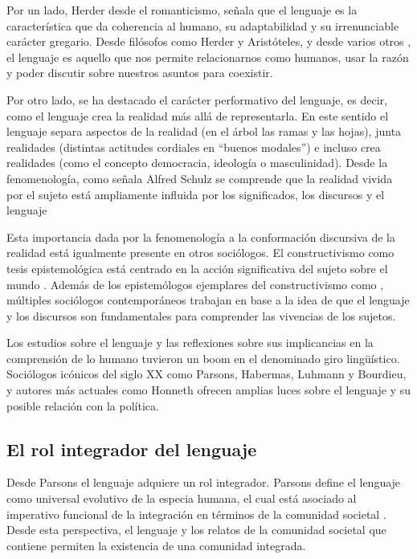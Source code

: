 \documentclass[12pt,twoside]{templates/facsothesis}
\begin{document}
Por un lado, Herder desde el romanticismo, señala que el lenguaje es la característica que da coherencia al humano, su adaptabilidad y su irrenunciable carácter gregario. Desde filósofos como Herder y Aristóteles, y desde varios otros \citep[ej.][]{echeverria_Ontologia_2011, garcia_LENGUAJE_2013}, el lenguaje es aquello que nos permite relacionarnos como humanos, usar la razón y poder discutir sobre nuestros asuntos para coexistir.

Por otro lado, se ha destacado el carácter performativo del lenguaje, es decir, como el lenguaje crea la realidad más allá de representarla. En este sentido el lenguaje separa aspectos de la realidad (en el árbol las ramas y las hojas), junta realidades (distintas actitudes cordiales en ``buenos modales'') e incluso crea realidades (como el concepto democracia, ideología o masculinidad). Desde la fenomenología, como señala Alfred Schulz se comprende que la realidad vivida por el sujeto está ampliamente influida por los significados, los discursos y el lenguaje \citep{schutz_construccion_2000a}

Esta importancia dada por la fenomenología a la conformación discursiva de la realidad está igualmente presente en otros sociólogos. El constructivismo como tesis epistemológica está centrado en la acción significativa del sujeto sobre el mundo \citep{sanchez_Constructivismo_2002}. Además de los epistemólogos ejemplares del constructivismo como \citet{berger_social_1979}, múltiples sociólogos contemporáneos trabajan en base a la idea de que el lenguaje y los discursos son fundamentales para comprender las vivencias de los sujetos.

Los estudios sobre el lenguaje y las reflexiones sobre sus implicancias en la comprensión de lo humano tuvieron un boom en el denominado giro lingüístico. Sociólogos icónicos del siglo XX como Parsons, Habermas, Luhmann y Bourdieu, y autores más actuales como Honneth ofrecen amplias luces sobre el lenguaje y su posible relación con la política.

\hypertarget{el-rol-integrador-del-lenguaje}{%
\subsection{El rol integrador del lenguaje}\label{el-rol-integrador-del-lenguaje}}

Desde Parsons el lenguaje adquiere un rol integrador. Parsons define el lenguaje como universal evolutivo de la especia humana, el cual está asociado al imperativo funcional de la integración en términos de la comunidad societal \citep{chernilo_Sociedad_1999}. Desde esta perspectiva, el lenguaje y los relatos de la comunidad societal que contiene permiten la existencia de una comunidad integrada.
\end{document}
